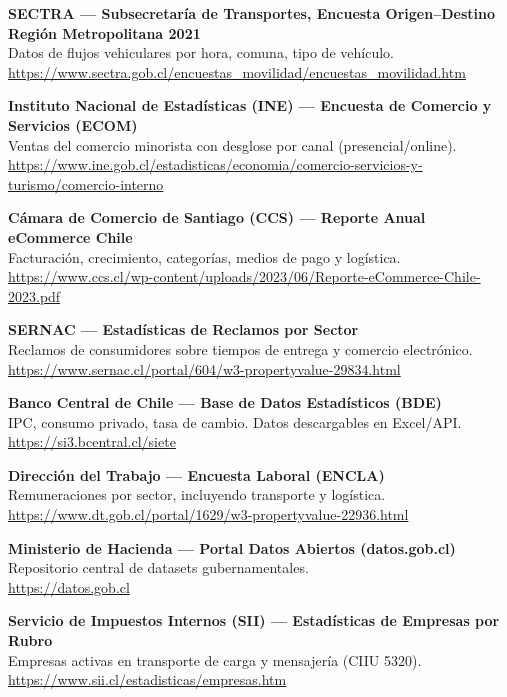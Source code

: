 \documentclass[12pt,a4paper]{article}
\begin{document}
\begin{enumerate}[leftmargin=1.5cm,label=\textbf{[\arabic*]}]

\item \textbf{SECTRA — Subsecretaría de Transportes, Encuesta Origen--Destino
  Región Metropolitana 2021}\\
  Datos de flujos vehiculares por hora, comuna, tipo de vehículo.\\
  \url{https://www.sectra.gob.cl/encuestas_movilidad/encuestas_movilidad.htm}

\item \textbf{Instituto Nacional de Estadísticas (INE) — Encuesta de
  Comercio y Servicios (ECOM)}\\
  Ventas del comercio minorista con desglose por canal (presencial/online).\\
  \url{https://www.ine.gob.cl/estadisticas/economia/comercio-servicios-y-turismo/comercio-interno}

\item \textbf{Cámara de Comercio de Santiago (CCS) — Reporte Anual
  eCommerce Chile}\\
  Facturación, crecimiento, categorías, medios de pago y logística.\\
  \url{https://www.ccs.cl/wp-content/uploads/2023/06/Reporte-eCommerce-Chile-2023.pdf}

\item \textbf{SERNAC — Estadísticas de Reclamos por Sector}\\
  Reclamos de consumidores sobre tiempos de entrega y comercio electrónico.\\
  \url{https://www.sernac.cl/portal/604/w3-propertyvalue-29834.html}

\item \textbf{Banco Central de Chile — Base de Datos Estadísticos (BDE)}\\
  IPC, consumo privado, tasa de cambio. Datos descargables en Excel/API.\\
  \url{https://si3.bcentral.cl/siete}

\item \textbf{Dirección del Trabajo — Encuesta Laboral (ENCLA)}\\
  Remuneraciones por sector, incluyendo transporte y logística.\\
  \url{https://www.dt.gob.cl/portal/1629/w3-propertyvalue-22936.html}

\item \textbf{Ministerio de Hacienda — Portal Datos Abiertos (datos.gob.cl)}\\
  Repositorio central de datasets gubernamentales.\\
  \url{https://datos.gob.cl}

\item \textbf{Servicio de Impuestos Internos (SII) — Estadísticas de
  Empresas por Rubro}\\
  Empresas activas en transporte de carga y mensajería (CIIU 5320).\\
  \url{https://www.sii.cl/estadisticas/empresas.htm}

\end{enumerate}
\end{document}
